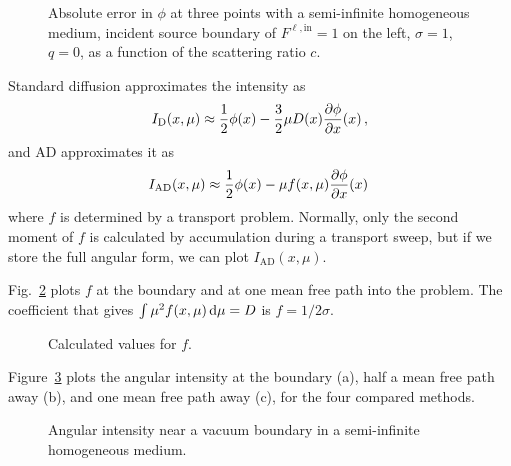 \begin{figure}[htb]
  \centering
  
  \caption{Absolute error in $\phi$ at three points with a semi-infinite
  homogeneous medium, incident source
  boundary of $F^{\ell,\mathrm{in}}=1$ on the left, $\sigma=1$, $q=0$, as a
  function of the scattering ratio $c$.}
  \label{fig:bndycondHomogC}
\end{figure}
%
%  

Standard diffusion approximates the intensity as
\begin{equation*}
  I_\mathrm{D}(x, \mu) \approx \frac{1}{2} \phi(x) - \frac{3}{2} \mu D(x) \frac{\partial \phi}{\partial x}(x)\,,
\end{equation*}
and AD approximates it as
\begin{equation*}
  I_\mathrm{AD}(x, \mu) \approx \frac{1}{2} \phi(x) - \mu f(x, \mu)
  \frac{\partial \phi}{\partial x}(x)\,
\end{equation*}
where $f$ is determined by a transport problem. Normally, only the second
moment of $f$ is calculated by accumulation during a transport sweep, but if we
store the full angular form, we can plot $I_\mathrm{AD}(x, \mu)$.

Fig.~\ref{fig:bndycondAdfOut} plots $f$ at the boundary and at one mean free
path into the problem. The coefficient that gives $\int \mu^2 f(x,\mu) \mathop{}\!\mathrm{d} \mu
=D $ is $f=1/2\sigma$.

\begin{figure}[htb]
  \centering
  \hspace{-.6in}
  \subfigure[$x=0.00125$]{
  
  }
  \hspace{-.2in}
  \subfigure[$x=1$]{
  
  }
  \hspace{-.6in}
  \caption{Calculated values for $f$.}
  \label{fig:bndycondAdfOut}
\end{figure}

Figure~\ref{fig:bndycondAngularIntensity} plots the angular intensity at the
boundary (a), half a mean free path away (b), and one mean free path away (c),
for the four compared methods. 
\begin{figure}[htb]
  \centering
  \hspace{-.6in}
  \subfigure[$x=0.00125$]{
  
  }
  \hspace{-.2in}
  \subfigure[$x=0.5$]{
  
  }
  \hspace{-.6in}

  \subfigure[$x=1$]{
  
  }
  \caption{Angular intensity near a vacuum boundary in a semi-infinite
  homogeneous medium.}
  \label{fig:bndycondAngularIntensity}
\end{figure}


